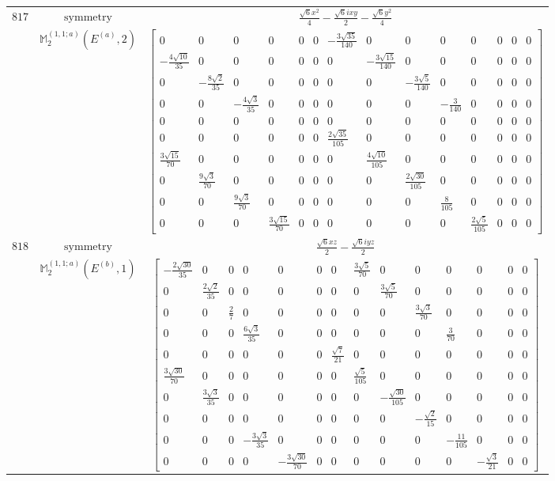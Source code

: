 \documentclass[fleqn,8pt,landscape]{jsarticle}
\begin{document}
\begin{longtable}{ccc}
$ 817 $ & $ \text{symmetry} $ & $ \frac{\sqrt{6} x^{2}}{4} - \frac{\sqrt{6} i x y}{2} - \frac{\sqrt{6} y^{2}}{4} $ \\
$  $ & $ \mathbb{M}_{2}^{(1,1;a)}(E^{(a)},2) $ & $ \begin{bmatrix} 0 & 0 & 0 & 0 & 0 & 0 & - \frac{3 \sqrt{35}}{140} & 0 & 0 & 0 & 0 & 0 & 0 & 0 \\ - \frac{4 \sqrt{10}}{35} & 0 & 0 & 0 & 0 & 0 & 0 & - \frac{3 \sqrt{15}}{140} & 0 & 0 & 0 & 0 & 0 & 0 \\ 0 & - \frac{8 \sqrt{2}}{35} & 0 & 0 & 0 & 0 & 0 & 0 & - \frac{3 \sqrt{5}}{140} & 0 & 0 & 0 & 0 & 0 \\ 0 & 0 & - \frac{4 \sqrt{3}}{35} & 0 & 0 & 0 & 0 & 0 & 0 & - \frac{3}{140} & 0 & 0 & 0 & 0 \\ 0 & 0 & 0 & 0 & 0 & 0 & 0 & 0 & 0 & 0 & 0 & 0 & 0 & 0 \\ 0 & 0 & 0 & 0 & 0 & 0 & \frac{2 \sqrt{35}}{105} & 0 & 0 & 0 & 0 & 0 & 0 & 0 \\ \frac{3 \sqrt{15}}{70} & 0 & 0 & 0 & 0 & 0 & 0 & \frac{4 \sqrt{10}}{105} & 0 & 0 & 0 & 0 & 0 & 0 \\ 0 & \frac{9 \sqrt{3}}{70} & 0 & 0 & 0 & 0 & 0 & 0 & \frac{2 \sqrt{30}}{105} & 0 & 0 & 0 & 0 & 0 \\ 0 & 0 & \frac{9 \sqrt{3}}{70} & 0 & 0 & 0 & 0 & 0 & 0 & \frac{8}{105} & 0 & 0 & 0 & 0 \\ 0 & 0 & 0 & \frac{3 \sqrt{15}}{70} & 0 & 0 & 0 & 0 & 0 & 0 & \frac{2 \sqrt{5}}{105} & 0 & 0 & 0 \end{bmatrix} $ \\ \hline
$ 818 $ & $ \text{symmetry} $ & $ \frac{\sqrt{6} x z}{2} - \frac{\sqrt{6} i y z}{2} $ \\
$  $ & $ \mathbb{M}_{2}^{(1,1;a)}(E^{(b)},1) $ & $ \begin{bmatrix} - \frac{2 \sqrt{30}}{35} & 0 & 0 & 0 & 0 & 0 & 0 & \frac{3 \sqrt{5}}{70} & 0 & 0 & 0 & 0 & 0 & 0 \\ 0 & \frac{2 \sqrt{2}}{35} & 0 & 0 & 0 & 0 & 0 & 0 & \frac{3 \sqrt{5}}{70} & 0 & 0 & 0 & 0 & 0 \\ 0 & 0 & \frac{2}{7} & 0 & 0 & 0 & 0 & 0 & 0 & \frac{3 \sqrt{3}}{70} & 0 & 0 & 0 & 0 \\ 0 & 0 & 0 & \frac{6 \sqrt{3}}{35} & 0 & 0 & 0 & 0 & 0 & 0 & \frac{3}{70} & 0 & 0 & 0 \\ 0 & 0 & 0 & 0 & 0 & 0 & \frac{\sqrt{7}}{21} & 0 & 0 & 0 & 0 & 0 & 0 & 0 \\ \frac{3 \sqrt{30}}{70} & 0 & 0 & 0 & 0 & 0 & 0 & \frac{\sqrt{5}}{105} & 0 & 0 & 0 & 0 & 0 & 0 \\ 0 & \frac{3 \sqrt{3}}{35} & 0 & 0 & 0 & 0 & 0 & 0 & - \frac{\sqrt{30}}{105} & 0 & 0 & 0 & 0 & 0 \\ 0 & 0 & 0 & 0 & 0 & 0 & 0 & 0 & 0 & - \frac{\sqrt{2}}{15} & 0 & 0 & 0 & 0 \\ 0 & 0 & 0 & - \frac{3 \sqrt{3}}{35} & 0 & 0 & 0 & 0 & 0 & 0 & - \frac{11}{105} & 0 & 0 & 0 \\ 0 & 0 & 0 & 0 & - \frac{3 \sqrt{30}}{70} & 0 & 0 & 0 & 0 & 0 & 0 & - \frac{\sqrt{3}}{21} & 0 & 0 \end{bmatrix} $ \\ \hline

\end{longtable}
\end{document}

